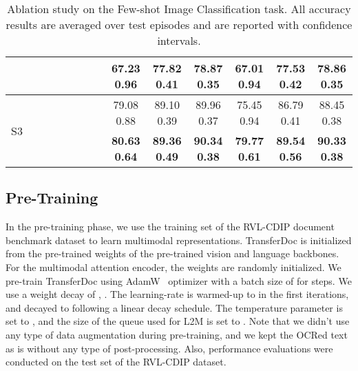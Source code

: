 \documentclass[preprint,review,12pt]{elsarticle}
\newcommand{\cmark}{\ding{51}}\newcommand{\xmark}{\ding{55}}\usepackage{setspace} \doublespacing
\begin{document}
\begin{table*}[t]
\begin{center}
{\begin{tabular}{l|ccc|cc|cc|ccc|ccc}
    & \cmark & \cmark & \xmark
    & \cmark & \cmark
    & \xmark & \cmark & \textbf{67.23}  \textbf{0.96} & \textbf{77.82}  \textbf{0.41} & \textbf{78.87}  \textbf{0.35}
    & \textbf{67.01}  \textbf{0.94} & \textbf{77.53}  \textbf{0.42} & \textbf{78.86}  \textbf{0.35} \\
    
    \hline
    
    \multirow{2}{*}{S3} 
    & \cmark & \cmark & \cmark
    & \xmark & \cmark
    & \xmark & \cmark & 79.08  0.88 & 89.10  0.39 & 89.96  0.37
    & 75.45  0.94 & 86.79  0.41 & 88.45  0.38 \\

    & \cmark & \cmark & \cmark
    & \cmark & \cmark
    & \xmark & \cmark  & \textbf{80.63}  \textbf{0.64} & \textbf{89.36}  \textbf{0.49} & \textbf{90.34}  \textbf{0.38}
    & \textbf{79.77}  \textbf{0.61} & \textbf{89.54}  \textbf{0.56} & \textbf{90.33}  \textbf{0.38} \\
    
   \hline
   
    \end{tabular}}
\end{center}
\caption{Ablation study on the Few-shot Image Classification task. All accuracy results are averaged over  test episodes and are reported with  confidence intervals.}
\label{tab:table_5.2}
\end{table*}  
\subsection{Pre-Training}
In the pre-training phase, we use the training set of the RVL-CDIP document benchmark dataset to learn multimodal representations. TransferDoc is initialized from the pre-trained weights of the pre-trained vision and language backbones. For the multimodal attention encoder, the weights are randomly initialized. We pre-train TransferDoc using AdamW~\cite{loshchilov2017decoupled} optimizer with a batch size of  for  steps. We use a weight decay of , . The learning-rate is warmed-up to  in the first  iterations, and decayed to  following a linear decay schedule. The temperature parameter  is set to , and the size of the queue used for L2M is set to . Note that we didn't use any type of data augmentation during pre-training, and we kept the OCRed text as is without any type of post-processing. Also, performance evaluations were conducted on the test set of the RVL-CDIP dataset.
\end{document}
